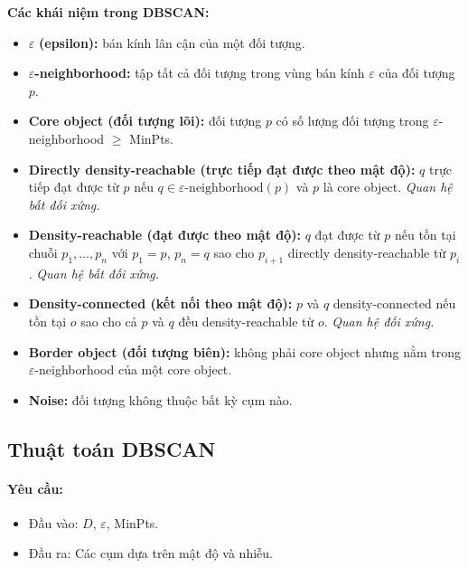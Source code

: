 \documentclass[10pt]{article}
\begin{document}
\textbf{Các khái niệm trong DBSCAN:}
\begin{itemize}
    \item $\varepsilon$ \textbf{(epsilon):} bán kính lân cận của một đối tượng.
    \item \textbf{$\varepsilon$-neighborhood:} tập tất cả đối tượng trong vùng bán kính $\varepsilon$ của đối tượng $p$.
    \item \textbf{Core object (đối tượng lõi):} đối tượng $p$ có số lượng đối tượng trong $\varepsilon$-neighborhood $\geq$ MinPts.
    \item \textbf{Directly density-reachable (trực tiếp đạt được theo mật độ):} $q$ trực tiếp đạt được từ $p$ nếu $q \in \varepsilon\text{-neighborhood}(p)$ và $p$ là core object. \textit{Quan hệ bất đối xứng.}
    \item \textbf{Density-reachable (đạt được theo mật độ):} $q$ đạt được từ $p$ nếu tồn tại chuỗi $p_1, \dots, p_n$ với $p_1=p$, $p_n=q$ sao cho $p_{i+1}$ directly density-reachable từ $p_i$. \textit{Quan hệ bất đối xứng.}
    \item \textbf{Density-connected (kết nối theo mật độ):} $p$ và $q$ density-connected nếu tồn tại $o$ sao cho cả $p$ và $q$ đều density-reachable từ $o$. \textit{Quan hệ đối xứng.}
    \item \textbf{Border object (đối tượng biên):} không phải core object nhưng nằm trong $\varepsilon$-neighborhood của một core object.
    \item \textbf{Noise:} đối tượng không thuộc bất kỳ cụm nào.
\end{itemize}

\subsection{Thuật toán DBSCAN}

\paragraph{Yêu cầu:}
\begin{itemize}
    \item Đầu vào: $D$, $\varepsilon$, MinPts.
    \item Đầu ra: Các cụm dựa trên mật độ và nhiễu.
\end{itemize}
\end{document}
